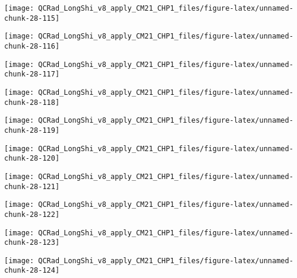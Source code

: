 \documentclass[
  10pt,
  a4paper,oneside]{article}
\begin{document}
\begin{center}\texttt{[image: QCRad\_LongShi\_v8\_apply\_CM21\_CHP1\_files/figure-latex/unnamed-chunk-28-115]} \end{center}

\begin{center}\texttt{[image: QCRad\_LongShi\_v8\_apply\_CM21\_CHP1\_files/figure-latex/unnamed-chunk-28-116]} \end{center}

\begin{center}\texttt{[image: QCRad\_LongShi\_v8\_apply\_CM21\_CHP1\_files/figure-latex/unnamed-chunk-28-117]} \end{center}

\begin{center}\texttt{[image: QCRad\_LongShi\_v8\_apply\_CM21\_CHP1\_files/figure-latex/unnamed-chunk-28-118]} \end{center}

\begin{center}\texttt{[image: QCRad\_LongShi\_v8\_apply\_CM21\_CHP1\_files/figure-latex/unnamed-chunk-28-119]} \end{center}

\begin{center}\texttt{[image: QCRad\_LongShi\_v8\_apply\_CM21\_CHP1\_files/figure-latex/unnamed-chunk-28-120]} \end{center}

\begin{center}\texttt{[image: QCRad\_LongShi\_v8\_apply\_CM21\_CHP1\_files/figure-latex/unnamed-chunk-28-121]} \end{center}

\begin{center}\texttt{[image: QCRad\_LongShi\_v8\_apply\_CM21\_CHP1\_files/figure-latex/unnamed-chunk-28-122]} \end{center}

\begin{center}\texttt{[image: QCRad\_LongShi\_v8\_apply\_CM21\_CHP1\_files/figure-latex/unnamed-chunk-28-123]} \end{center}

\begin{center}\texttt{[image: QCRad\_LongShi\_v8\_apply\_CM21\_CHP1\_files/figure-latex/unnamed-chunk-28-124]} \end{center}
\end{document}

